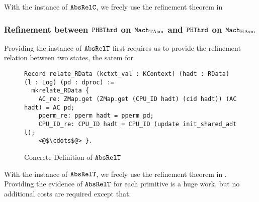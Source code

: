  
With the instance of ${\mathrm{\texttt{AbsRelC}}}$,
we freely use the refinement theorem in 



\subsubsection{Refinement between ${\mathrm{\texttt{PHBThrd}}}$ on ${\mathrm{\texttt{Mach}}}_{\mathrm{TAsm}}$ and 
 ${\mathrm{\texttt{PHThrd}}}$ on ${\mathrm{\texttt{Mach}}}_{\mathrm{HAsm}}$}


Providing the instance of ${\mathrm{\texttt{AbsRelT}}}$ first requires us 
to provide 
the refinement relation between two states, the satem for 


\begin{figure}
\begin{lstlisting}
Record relate_RData (kctxt_val : KContext) (hadt : RData) (l : Log) (pd : dproc) :=
  mkrelate_RData {
    AC_re: ZMap.get (ZMap.get (CPU_ID hadt) (cid hadt)) (AC hadt) = AC pd;    
    pperm_re: pperm hadt = pperm pd;
    CPU_ID_re: CPU_ID hadt = CPU_ID (update init_shared_adt l); 
    <@$\cdots$@> }.
\end{lstlisting}
\caption{Concrete Definition of ${\mathrm{\texttt{AbsRelT}}}$}
\label{fig:chapter:certikos:absrelt-of-multithreaded-linking-certikos}
\end{figure}

With the instance of ${\mathrm{\texttt{AbsRelT}}}$,
we freely use the refinement theorem in .
Providing the evidence of ${\mathrm{\texttt{AbsRelT}}}$
for each primitive is a huge work, 
but no additional costs are required 
except that. 





